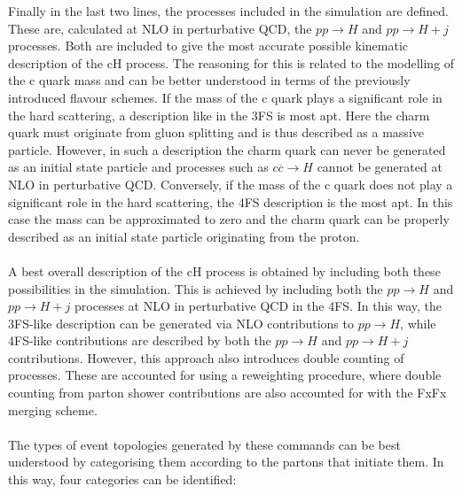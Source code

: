 Finally in the last two lines, the processes included in the simulation are defined. These are, calculated at NLO in perturbative QCD, the $p p \rightarrow H$ and $p p \rightarrow H+j$ processes. Both are included to give the most accurate possible kinematic description of the cH process. The reasoning for this is related to the modelling of the c quark mass and can be better understood in terms of the previously introduced flavour schemes. If the mass of the c quark plays a significant role in the hard scattering, a description like in the 3FS is most apt. Here the charm quark must originate from gluon splitting and is thus described as a massive particle. However, in such a description the charm quark can never be generated as an initial state particle and processes such as $c\overline{c}\rightarrow H$ cannot be generated at NLO in perturbative QCD. Conversely, if the mass of the c quark does not play a significant role in the hard scattering, the 4FS description is the most apt. In this case the mass can be approximated to zero and the charm quark can be properly described as an initial state particle originating from the proton. \\
\\
A best overall description of the cH process is obtained by including both these possibilities in the simulation. This is achieved by including both the $p p \rightarrow H$ and $p p \rightarrow H+j$ processes at NLO in perturbative QCD in the 4FS. In this way, the 3FS-like description can be generated via NLO contributions to $p p \rightarrow H$, while 4FS-like contributions are described by both the $p p \rightarrow H$ and $p p \rightarrow H+j$ contributions. However, this approach also introduces double counting of processes. These are accounted for using a reweighting procedure, where double counting from parton shower contributions are also accounted for with the FxFx merging scheme.  \\
\\
The types of event topologies generated by these commands can be best understood by categorising them according to the partons that initiate them. In this way, four categories can be identified:
